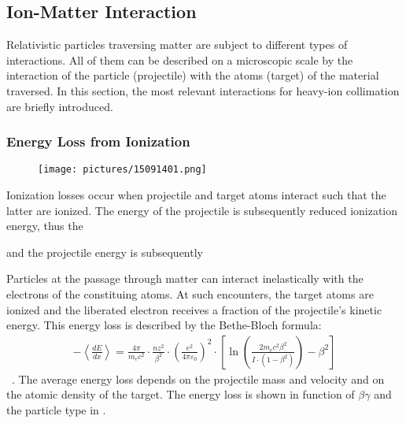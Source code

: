 \subsection{Ion-Matter Interaction} \label{chap:ionmatterinteraction}

Relativistic particles traversing matter are subject to different types of interactions. All of them can be described on a microscopic scale by the interaction of the particle (projectile) with the atoms (target) of the material traversed. In this section, the most relevant interactions for heavy-ion collimation are briefly introduced.

\subsubsection{Energy Loss from Ionization}

  \begin{figure}[b]
  \centering
  \texttt{[image: pictures/15091401.png]}
  \caption{}  
  \label{pic:15091401}
  \end{figure}

Ionization losses occur when projectile and target atoms interact such that the latter are ionized. The energy of the projectile is subsequently reduced ionization energy, thus the 

and the projectile energy is subsequently


Particles at the passage through matter can interact inelastically with the electrons of the constituing atoms. At such encounters, the target atoms are ionized and the liberated electron receives a fraction of the projectile's kinetic energy. This energy loss is described by the Bethe-Bloch formula:
\begin{align}
- \left\langle\frac{dE}{dx}\right\rangle = \frac{4 \pi}{m_e c^2} \cdot \frac{nz^2}{\beta^2} \cdot \left(\frac{e^2}{4\pi\varepsilon_0}\right)^2 \cdot \left[\ln \left(\frac{2m_e c^2 \beta^2}{I \cdot (1-\beta^2)}\right) - \beta^2\right]
\end{align} \, .
The average energy loss depends on the projectile mass and velocity and on the atomic density of the target. The energy loss is shown in function of $\beta \gamma$ and the particle type in .

